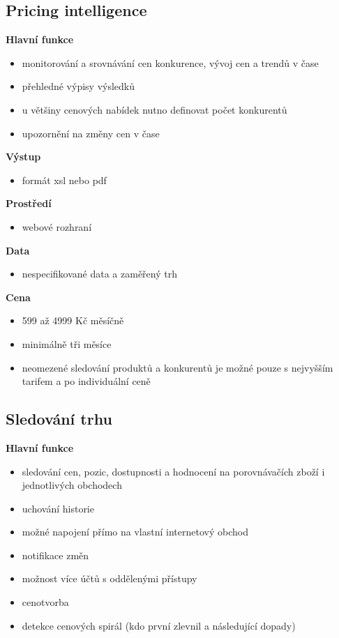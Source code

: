 \documentclass[thesis=B,czech]{FITthesis}[2012/06/26]
\begin{document}
\newpage

\subsection{Pricing intelligence\cite{pricingIntelligence}} 

\textbf{Hlavní funkce}
\begin{itemize}
\item monitorování a srovnávání cen konkurence, vývoj cen a trendů v čase
\item přehledné výpisy výsledků
\item u většiny cenových nabídek nutno definovat počet konkurentů
\item upozornění na změny cen v čase
\end{itemize}

\textbf{Výstup}
\begin{itemize}
\item formát xsl nebo pdf
\end{itemize}

\textbf{Prostředí}
\begin{itemize}
\item webové rozhraní
\end{itemize}

\textbf{Data}
\begin{itemize}
\item nespecifikované data a zaměřený trh
\end{itemize}

\textbf{Cena}
\begin{itemize}
\item 599 až 4999 Kč měsíčně
\item minimálně tři měsíce
\item neomezené sledování produktů a konkurentů je možné pouze s nejvyšším tarifem a po individuální ceně
\end{itemize}


\subsection{Sledování trhu\cite{sledovaniTrhu}} 
\textbf{Hlavní funkce}
\begin{itemize}
\item sledování cen, pozic, dostupnosti a hodnocení na porovnávačích zboží i jednotlivých obchodech
\item uchování historie
\item možné napojení přímo na vlastní internetový obchod
\item notifikace změn
\item možnost více účtů s oddělenými přístupy
\item cenotvorba
\item detekce cenových spirál (kdo první zlevnil a následující dopady)
\end{itemize}
\end{document}
